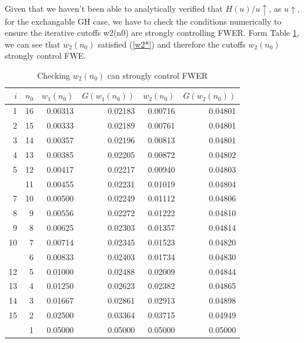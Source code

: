 \documentclass[12pt,fleqn] {article}
\begin{document}
{Given that we haven’t been able to analytically verified that $H(u)/u \uparrow$, as $u\uparrow$, for the exchangable GH case, we have to check the conditions numerically to ensure the iterative cutoffs w2(n0) are strongly controlling FWER. Form Table \ref{checking_FWER}, we can see that $w_2(n_0)$ satisfied (\ref{w2*}) and therefore the cutoffs $w_2(n_0)$ strongly control FWE. 

\begin{table}[ht]
\centering
\begin{tabular}{rrrrrr}
\toprule
$i$ & $n_0$ & $w_1(n_0)$ & $G(w_1(n_0))$ & $w_2(n_0)$ & $G(w_2(n_0))$ \\
\midrule
1 & 16 & 0.00313 & 0.02183 & 0.00716 & 0.04801\\
2 & 15 & 0.00333 & 0.02189 & 0.00761 & 0.04801\\
3 & 14 & 0.00357 & 0.02196 & 0.00813 & 0.04801\\
4 & 13 & 0.00385 & 0.02205 & 0.00872 & 0.04802\\
5 & 12 & 0.00417 & 0.02217 & 0.00940 & 0.04803\\
\addlinespace
6 & 11 & 0.00455 & 0.02231 & 0.01019 & 0.04804\\
7 & 10 & 0.00500 & 0.02249 & 0.01112 & 0.04806\\
8 & 9 & 0.00556 & 0.02272 & 0.01222 & 0.04810\\
9 & 8 & 0.00625 & 0.02303 & 0.01357 & 0.04814\\
10 & 7 & 0.00714 & 0.02345 & 0.01523 & 0.04820\\
\addlinespace
11 & 6 & 0.00833 & 0.02403 & 0.01734 & 0.04830\\
12 & 5 & 0.01000 & 0.02488 & 0.02009 & 0.04844\\
13 & 4 & 0.01250 & 0.02623 & 0.02382 & 0.04865\\
14 & 3 & 0.01667 & 0.02861 & 0.02913 & 0.04898\\
15 & 2 & 0.02500 & 0.03364 & 0.03715 & 0.04949\\
\addlinespace
16 & 1 & 0.05000 & 0.05000 & 0.05000 & 0.05000\\
\bottomrule
\end{tabular}
\caption{Checking $w_2(n_0)$ can strongly control FWER} \label{checking_FWER}
\end{table}

}
\end{document}
